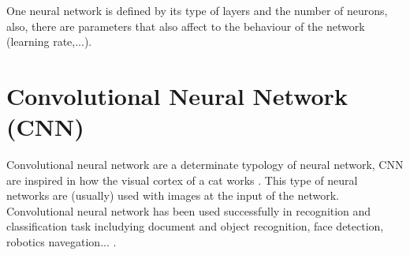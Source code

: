 One neural network is defined by its type of layers and the number of neurons, also, there are parameters that also affect to the behaviour of the network (learning rate,...)\cite{Lecum2}.



\section{Convolutional Neural Network (CNN)}
Convolutional neural network are a determinate typology of neural network, CNN are inspired in how the visual cortex of a cat works \cite{Doorn}. This type of neural networks are (usually) used with images at the input of the network.\\

Convolutional neural network has been used successfully in recognition and classification task includying document and object recognition, face detection, robotics navegation... \cite{Lecum2, Lecum3}.\\
